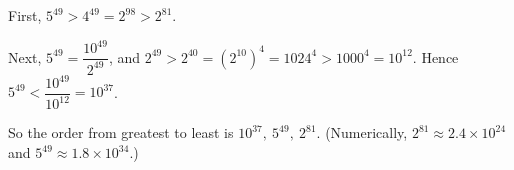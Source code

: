 First, $5^{49}>4^{49}=2^{98}>2^{81}$.

Next, $5^{49}=\dfrac{10^{49}}{2^{49}}$, and $2^{49}>2^{40}=\left(2^{10}\right)^4=1024^4>1000^4=10^{12}$. Hence $5^{49}<\dfrac{10^{49}}{10^{12}}=10^{37}$.

So the order from greatest to least is $\boxed{10^{37},\ 5^{49},\ 2^{81}}$. (Numerically, $2^{81}\approx2.4\times10^{24}$ and $5^{49}\approx1.8\times10^{34}$.)
